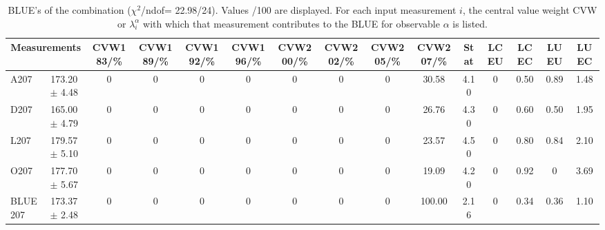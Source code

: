 \begin{table}[H]
\scriptsize
\begin{center}
\renewcommand{\arraystretch}{1.1}
\begin{tabular}{|lc|c|c|c|c|c|c|c|c|ccccc|}
\hline
\multicolumn{2}{|c|}{Measurements} & CVW{\tiny 183}/\%  & CVW{\tiny 189}/\%  & CVW{\tiny 192}/\%  & CVW{\tiny 196}/\%  & CVW{\tiny 200}/\%  & CVW{\tiny 202}/\%  & CVW{\tiny 205}/\%  & CVW{\tiny 207}/\%  & {\tiny Stat} & {\tiny LCEU} & {\tiny LCEC} & {\tiny LUEU} & {\tiny LUEC}\\
\hline
A207 &     173.20 $\pm$       4.48 &  0 &  0 &  0 &  0 &  0 &  0 &  0 &      30.58 &       4.10 &  0 &       0.50 &       0.89 &       1.48\\
D207 &     165.00 $\pm$       4.79 &  0 &  0 &  0 &  0 &  0 &  0 &  0 &      26.76 &       4.30 &  0 &       0.60 &       0.50 &       1.95\\
L207 &     179.57 $\pm$       5.10 &  0 &  0 &  0 &  0 &  0 &  0 &  0 &      23.57 &       4.50 &  0 &       0.80 &       0.84 &       2.10\\
O207 &     177.70 $\pm$       5.67 &  0 &  0 &  0 &  0 &  0 &  0 &  0 &      19.09 &       4.20 &  0 &       0.92 &  0 &       3.69\\
\hline
BLUE {\tiny 207} &     173.37 $\pm$       2.48 &  0 &  0 &  0 &  0 &  0 &  0 &  0 &     100.00 &       2.16 &  0 &       0.34 &       0.36 &       1.10\\
\hline
\end{tabular}
\caption{BLUE's of the combination ($\chi^2$/ndof=     22.98/24).
 Values /100 are displayed. For each input measurement $i$, the central value weight CVW or $\lambda_i^\alpha$ with which that measurement contributes to the BLUE for observable $\alpha$ is listed.}
\renewcommand{\arraystretch}{1}
\end{center}
\end{table}
